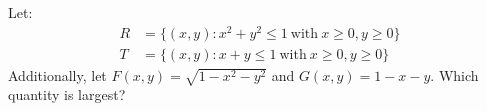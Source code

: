 \documentclass{ximera}
\begin{document}
\begin{problem}
  Let:
  \begin{align*}
    R &= \{(x,y): x^2 +y^2 \le 1~\text{with}~x\ge0, y\ge0\}\\
    T &= \{(x,y): x+y\le 1~\text{with}~x\ge0, y\ge0\}
  \end{align*}
  Additionally, let $F(x,y) = \sqrt{1-x^2-y^2}$ and $G(x,y) = 1-x-y$.
  Which quantity is largest?
  \begin{multipleChoice}
      \pdfOnly{\end{multicols}}
  \end{multipleChoice}
  \end{problem}
\end{document}

